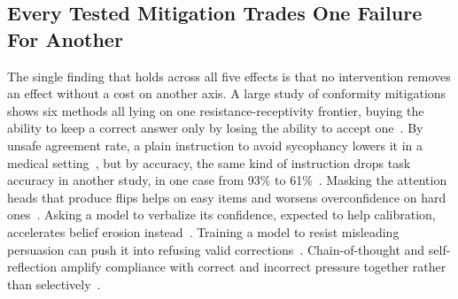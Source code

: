 \subsection{Every Tested Mitigation Trades One Failure For Another}
\label{sec:discussion_mitigation_tradeoff}

The single finding that holds across all five effects is that no intervention removes an effect without a cost on another axis. A large study of conformity mitigations shows six methods all lying on one resistance-receptivity frontier, buying the ability to keep a correct answer only by losing the ability to accept one~\citep{ConformityMitigationsLieOn_Hussain}. By unsafe agreement rate, a plain instruction to avoid sycophancy lowers it in a medical setting~\citep{MedPRESSPatientPressureInduced_Joy}, but by accuracy, the same kind of instruction drops task accuracy in another study, in one case from 93\% to 61\%~\citep{FirmOrFickleEvaluating_Li}. Masking the attention heads that produce flips helps on easy items and worsens overconfidence on hard ones~\citep{InterpretingAndMitigatingUnwanted_Roy}. Asking a model to verbalize its confidence, expected to help calibration, accelerates belief erosion instead~\citep{VulnerabilityOfLLMsStated_Huang}. Training a model to resist misleading persuasion can push it into refusing valid corrections~\citep{PersuasionDynamicsInLLMs_Tan}. Chain-of-thought and self-reflection amplify compliance with correct and incorrect pressure together rather than selectively~\citep{EasierToMisleadThan_Qu}.

